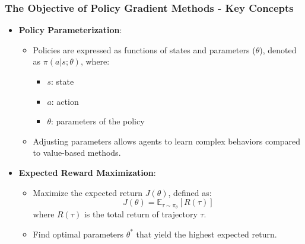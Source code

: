 \documentclass{beamer}
\begin{document}
\begin{frame}[fragile]
    \frametitle{The Objective of Policy Gradient Methods - Key Concepts}
    \begin{itemize}
        \item \textbf{Policy Parameterization}:
        \begin{itemize}
            \item Policies are expressed as functions of states and parameters ($\theta$), denoted as $\pi(a|s; \theta)$, where:
            \begin{itemize}
                \item $s$: state
                \item $a$: action
                \item $\theta$: parameters of the policy
            \end{itemize}
            \item Adjusting parameters allows agents to learn complex behaviors compared to value-based methods.
        \end{itemize}
        
        \item \textbf{Expected Reward Maximization}:
        \begin{itemize}
            \item Maximize the expected return $J(\theta)$, defined as:
            \begin{equation}
                J(\theta) = \mathbb{E}_{\tau \sim \pi_{\theta}} \left[ R(\tau) \right]
            \end{equation}
            where $R(\tau)$ is the total return of trajectory $\tau$.
            \item Find optimal parameters $\theta^*$ that yield the highest expected return.
        \end{itemize}
    \end{itemize}
\end{frame}
\end{document}
